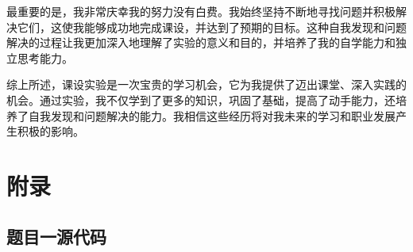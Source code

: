 \documentclass[UTF8,12pt]{article}
\begin{document}
最重要的是，我非常庆幸我的努力没有白费。我始终坚持不断地寻找问题并积极解决它们，这使我能够成功地完成课设，并达到了预期的目标。这种自我发现和问题解决的过程让我更加深入地理解了实验的意义和目的，并培养了我的自学能力和独立思考能力。

综上所述，课设实验是一次宝贵的学习机会，它为我提供了迈出课堂、深入实践的机会。通过实验，我不仅学到了更多的知识，巩固了基础，提高了动手能力，还培养了自我发现和问题解决的能力。我相信这些经历将对我未来的学习和职业发展产生积极的影响。

\newpage

\section{附录}
\subsection{题目一源代码}
\end{document}
